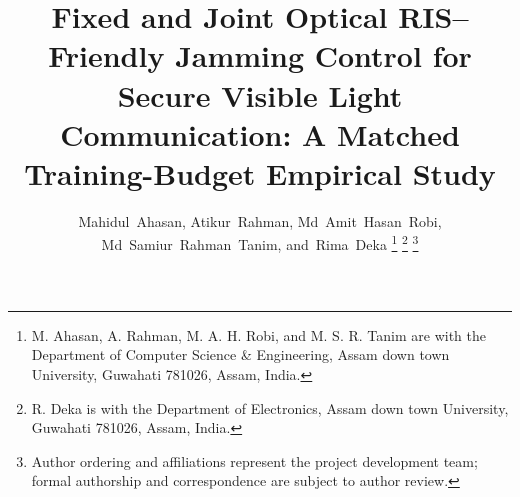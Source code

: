 \documentclass[journal,10pt,twocolumn]{IEEEtran}
\begin{document}
\title{Fixed and Joint Optical RIS--Friendly Jamming Control for Secure Visible Light Communication: A Matched Training-Budget Empirical Study}

\author{Mahidul~Ahasan,
        Atikur~Rahman,
        Md~Amit~Hasan~Robi,
        Md~Samiur~Rahman~Tanim,
        and~Rima~Deka%
\thanks{M. Ahasan, A. Rahman, M. A. H. Robi, and M. S. R. Tanim are with the Department of Computer Science \& Engineering, Assam down town University, Guwahati 781026, Assam, India.}%
\thanks{R. Deka is with the Department of Electronics, Assam down town University, Guwahati 781026, Assam, India.}%
\thanks{Author ordering and affiliations represent the project development team; formal authorship and correspondence are subject to author review.}}

\maketitle
\end{document}
